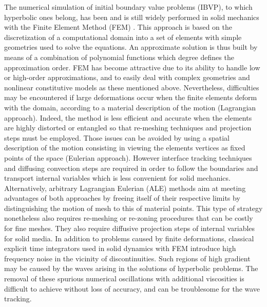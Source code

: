 The numerical simulation of initial boundary value problems (IBVP), to which hyperbolic ones belong, has been and is still widely performed in solid mechanics with the Finite Element Method (FEM) \cite{Belytschko}.
This approach is based on the discretization of a computational domain into a set of elements with simple geometries used to solve the equations.
An approximate solution is thus built by means of a combination of polynomial functions which degree defines the approximation order.
FEM has become attractive due to its ability to handle low or high-order approximations, and to easily deal with complex geometries and nonlinear constitutive models as these mentioned above.  %
Nevertheless, difficulties may be encountered if large deformations occur when the finite elements deform with the domain, according to a material description of the motion (Lagrangian approach).
Indeed, the method is less efficient and accurate when the elements are highly distorted or entangled so that re-meshing techniques and projection steps must be employed.
Those issues can be avoided by using a spatial description of the motion consisting in viewing the elements vertices as fixed points of the space (Eulerian approach).
However interface tracking techniques and diffusing convection steps are required in order to follow the boundaries and transport internal variables which is less convenient for solid mechanics.
Alternatively, arbitrary Lagrangian Eulerian (ALE) methods aim at meeting advantages of both approaches by freeing itself of their respective limits by distinguishing the motion of mesh to this of material points.
This type of strategy nonetheless also requires re-meshing or re-zoning procedures that can be costly for fine meshes. %
They also require diffusive projection steps of internal variables for solid media.
In addition to problems caused by finite deformations, classical explicit time integrators used in solid dynamics with FEM introduce high frequency noise in the vicinity of discontinuities.
Such regions of high gradient may be caused by the waves arising in the solutions of hyperbolic problems.
The removal of these spurious numerical oscillations with additional viscosities is difficult to achieve without loss of accuracy, and can be troublesome for the wave tracking.

